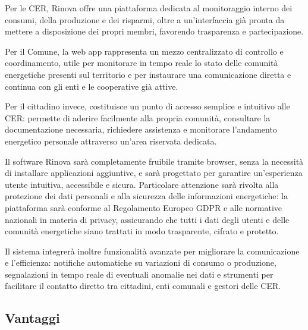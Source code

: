 Per le CER, Rinova offre una piattaforma dedicata al monitoraggio interno dei consumi, della produzione e dei risparmi, oltre a un’interfaccia già pronta da mettere a disposizione dei propri membri, favorendo trasparenza e partecipazione.

Per il Comune, la web app rappresenta un mezzo centralizzato di controllo e coordinamento, utile per monitorare in tempo reale lo stato delle comunità energetiche presenti sul territorio e per instaurare una comunicazione diretta e continua con gli enti e le cooperative già attive.

Per il cittadino invece, costituisce un punto di accesso semplice e intuitivo alle CER: permette di aderire facilmente alla propria comunità, consultare la documentazione necessaria, richiedere assistenza e monitorare l’andamento energetico personale attraverso un’area riservata dedicata.

Il software Rinova sarà completamente fruibile tramite browser, senza la necessità di installare applicazioni aggiuntive, e sarà progettato per garantire un’esperienza utente intuitiva, accessibile e sicura. Particolare attenzione sarà rivolta alla protezione dei dati personali e alla sicurezza delle informazioni energetiche: la piattaforma sarà conforme al Regolamento Europeo GDPR e alle normative nazionali in materia di privacy, assicurando che tutti i dati degli utenti e delle comunità energetiche siano trattati in modo trasparente, cifrato e protetto.

Il sistema integrerà inoltre funzionalità avanzate per migliorare la comunicazione e l’efficienza: notifiche automatiche su variazioni di consumo o produzione, segnalazioni in tempo reale di eventuali anomalie nei dati e strumenti per facilitare il contatto diretto tra cittadini, enti comunali e gestori delle CER.

\subsection{Vantaggi}
    
